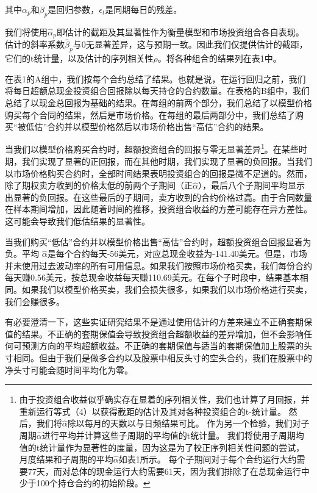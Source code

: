 \par{
    其中$\alpha_p$和$\beta_p$是回归参数，$\epsilon_t$是同期每日的残差。
}
\par{
    我们将使用$\hat{\alpha}_p$即估计的截距及其显著性作为衡量模型和市场投资组合各自表现。 估计的斜率系数$\hat{\beta}_p$与0无显著差异，这与预期一致。因此我们仅提供估计的截距，它们的t统计量，以及估计的序列相关性$\rho$。将各种组合的结果列在表1中。
}
\par{
    在表1的A组中，我们按每个合约总结了结果。也就是说，在运行回归之前，我们将每日超额总现金投资组合回报除以每天持仓的合约数量。在表格的B组中，我们总结了以现金总回报为基础的结果。在每组的前两个部分，我们总结了以模型价格购买每个合同的结果，然后是市场价格。在每组的最后两部分中，我们总结了购买“被低估”合约并以模型价格然后以市场价格出售“高估”合约的结果。
}
\par{
    当我们以模型价格购买合约时，超额投资组合的回报与零无显著差异\footnote{
        由于投资组合收益似乎确实存在显着的序列相关性，我们也计算了月回报，并重新运行等式（4）以获得截距的估计及其对各种投资组合的t-统计量。 然后，我们将$\hat{\alpha}$除以每月的天数以与日频结果可比。 作为另一个检验，我们对子周期$\hat{\alpha}$进行平均并计算这些子周期的平均值的t统计量。 我们将使用子周期均值的t统计量作为显著性的度量，因为这是为了校正序列相关性问题的尝试，月度结果和子周期的平均$\hat{\alpha}$如表1所示。  每个子期间对于每个合约运行大约需要77天，而对总体的现金运行大约需要61天，因为我们排除了在总现金运行中少于100个持仓合约的初始阶段。
    }。在某些时期，我们实现了显著的正回报，而在其他时期，我们实现了显著的负回报。当我们以市场价格购买合约时，全部时间结果表明投资组合的回报是微不足道的。然而，除了期权卖方收到的价格太低的前两个子期间（正$\hat{\alpha}$），最后八个子期间平均显示出显著的负回报。在这些最后的子期间，卖方收到的合约价格过高。由于合同数量在样本期间增加，因此随着时间的推移，投资组合收益的方差可能存在异方差性。这可能会导致我们低估结果的显著性。
}
\par{
    当我们购买“低估”合约并以模型价格出售“高估”合约时，超额投资组合回报显着为负。平均 $\hat{\alpha}$是每个合约每天-56美元，对应总现金收益为-141.40美元。但是，市场并未使用过去波动率的所有可用信息。如果我们按照市场价格买卖，我们每份合约每天赚0.56美元，按总现金收益每天赚110.69美元。在每个子时段中，结果基本相同。如果我们以模型价格买卖，我们会损失很多，如果我们以市场价格进行买卖，我们会赚很多。
}
\par{
    有必要澄清一下，这些实证研究结果不是通过使用估计的方差来建立不正确套期保值的结果。不正确的套期保值会导致投资组合超额收益的差异增加，但不会影响任何可预测方向的平均超额收益。不正确的套期保值与适当的套期保值加上股票的头寸相同。但由于我们是做多合约以及股票中相反头寸的空头合约，我们在股票中的净头寸可能会随时间平均化为零。
}
